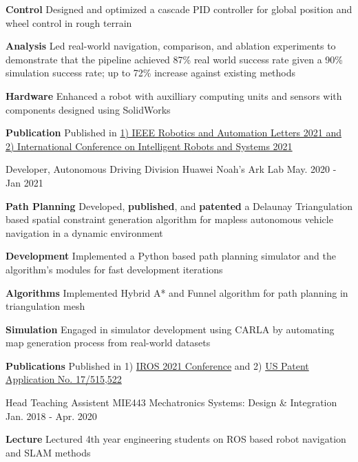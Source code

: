 \begin{cventries}
{\begin{cvitems}
{			}
			\item {
				\textbf{Control} Designed and optimized a cascade PID controller for global position and wheel control in rough terrain
			}
			\item {
				\textbf{Analysis} Led real-world navigation, comparison, and ablation experiments to demonstrate that the pipeline achieved 87\% real world success rate given a 90\% simulation success rate; up to 72\% increase against existing methods
			}
			\item {
				\textbf{Hardware} Enhanced a robot with auxilliary computing units and sensors with components designed using SolidWorks
			}
			\item {
				\textbf{Publication} Published in \href{https://ieeexplore.ieee.org/document/9468918}{1) IEEE Robotics and Automation Letters 2021 and 2) International Conference on Intelligent Robots and Systems 2021}
			}
		\end{cvitems}
	}
	\cventry
	{Developer, Autonomous Driving Division}
	{Huawei Noah’s Ark Lab}
	{May. 2020 - Jan 2021}
	{}
	{
		\begin{cvitems}
			\item {
				\textbf{Path Planning} Developed, \textbf{published}, and \textbf{patented} a Delaunay Triangulation based spatial constraint generation algorithm for mapless autonomous vehicle navigation in a dynamic environment
			}
			\item {
				\textbf{Development} Implemented a Python based path planning simulator and the algorithm's modules for fast development iterations
			}
			\item {
				\textbf{Algorithms} Implemented Hybrid A* and Funnel algorithm for path planning in triangulation mesh
			}
			\item {
				\textbf{Simulation} Engaged in simulator development using CARLA by automating map generation process from real-world datasets
			}
			\item{
				\textbf{Publications} Published in 1) \href{https://ieeexplore.ieee.org/document/9636067}{IROS 2021 Conference} and 2) \href{https://patents.google.com/patent/US20220135068A1/en}{US Patent Application No. 17/515,522}
			}
		\end{cvitems}
	}
	\cventry
	{Head Teaching Assistent}
	{MIE443 Mechatronics Systems: Design \& Integration}
	{Jan. 2018 - Apr. 2020}
	{}
	{
		\begin{cvitems}
			\item {
				\textbf{Lecture} Lectured 4th year engineering students on ROS based robot navigation and SLAM methods
}
\end{cvitems}}
\end{cventries}
